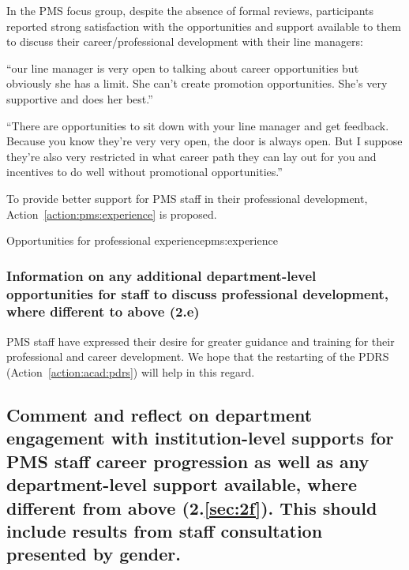 In the PMS focus group, despite the absence of formal reviews, participants reported strong satisfaction with the opportunities and support available to them to discuss their career/professional development with their line managers:
\begin{myquote}
    ``our line manager is very open to talking about career opportunities but obviously she has a limit. She can’t create promotion opportunities. She’s very supportive and does her best.''
\end{myquote}

\begin{myquote}
    ``There are opportunities to sit down with your line manager and get feedback. Because you know they’re very very open, the door is always open. But I suppose they’re also very restricted in what career path they can lay out for you and incentives to do well without promotional opportunities.''
\end{myquote}

To provide better support for PMS staff in their professional development,  Action~\ref{action:pms:experience} is proposed. 


\begin{actionblock}{\ksspace{}Opportunities for professional experience}{pms:experience}
\actpmsopportunities
\hfill{
    \hypersetup{hidelinks}
    \hyperlink{d8}{\gotoactionsymbol{}}
}
\end{actionblock}


\subsubsection{Information on any additional department-level opportunities for staff to discuss professional development, where different to above (2.e)}

PMS staff have expressed their desire for greater guidance and training for their professional and career development. 
We hope that the restarting of the PDRS (Action~\ref{action:acad:pdrs}) will help in this regard. 




\subsection{Comment and reflect on department engagement with institution-level supports for PMS staff career progression as well as any department-level support available, where different from above (2.\ref{sec:2f}). This should include results from staff consultation presented by gender.}

